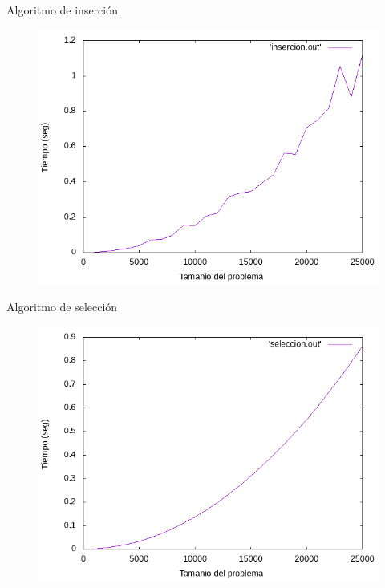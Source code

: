 \documentclass{beamer}
\begin{document}
\begin{frame}[fragile]{Algoritmo de inserción}
\begin{figure}[H]
\centering
\includegraphics[scale=0.5]{empirica_insercion.png}
\end{figure}
\end{frame}

\begin{frame}[fragile]{Algoritmo de selección}
\begin{figure}[H]
\centering
\includegraphics[scale=0.5]{empirica_seleccion.png}
\end{figure}
\end{frame}
\end{document}
